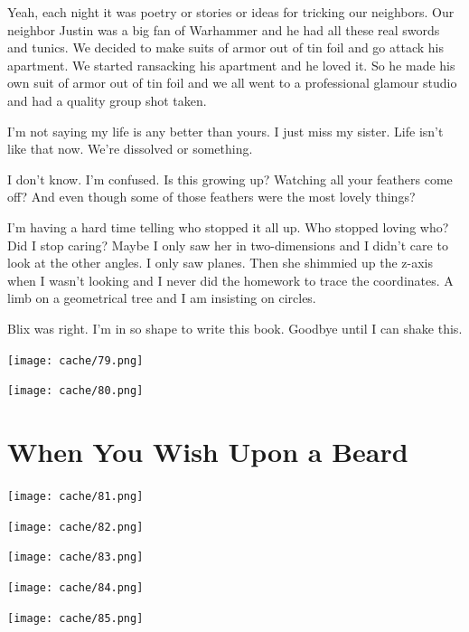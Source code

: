 \documentclass[12pt,twoside]{report}
\begin{document}
Yeah, each night it was poetry or stories or ideas for tricking our
neighbors.  Our neighbor Justin was a big fan of Warhammer and he had
all these real swords and tunics.  We decided to make suits of armor
out of tin foil and go attack his apartment.  We started ransacking
his apartment and he loved it.  So he made his own suit of armor out
of tin foil and we all went to a professional glamour studio and had a
quality group shot taken.


I'm not saying my life is any better than yours.  I just miss my
sister.  Life isn't like that now. We're dissolved or something.

I don't know.  I'm confused.  Is this growing up?  Watching all your
feathers come off?  And even though some of those feathers were the
most lovely things?

I'm having a hard time telling who stopped it all up.  Who stopped
loving who?  Did I stop caring?  Maybe I only saw her in
two-dimensions and I didn't care to look at the other angles.  I only
saw planes.  Then she shimmied up the z-axis when I wasn't looking and
I never did the homework to trace the coordinates.  A limb on a
geometrical tree and I am insisting on circles.

Blix was right.  I'm in so shape to write this book.  Goodbye until I
can shake this.

	\texttt{[image: cache/79.png]}

	\texttt{[image: cache/80.png]}

\newpage
\thispagestyle{empty}
\mbox{}
\newpage
\thispagestyle{empty}
\mbox{}
\cleartooddpage


\chapter{When You Wish Upon a Beard}
\vfill
\texttt{[image: cache/81.png]}
\vspace{4.6cm}
\newpage
\thispagestyle{empty}
\mbox{}
\clearpage


\vspace*{0.6cm} \texttt{[image: cache/82.png]}
\newpage

\vspace*{0.6cm} \texttt{[image: cache/83.png]}
\newpage

\vspace*{0.6cm} \texttt{[image: cache/84.png]}
\newpage

\vspace*{0.6cm} \texttt{[image: cache/85.png]}
\newpage
\end{document}
